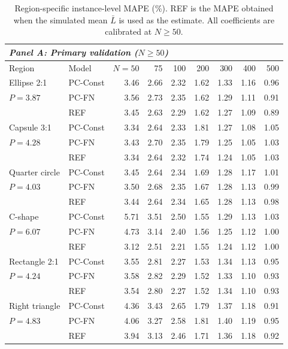 \begin{table}[htbp]
\centering
\caption{Region-specific instance-level MAPE (\%). REF is the MAPE obtained when the simulated mean $\bar{L}$ is used as the estimate. All coefficients are calibrated at $N \ge 50$.}
\label{tab:A2}
\scriptsize
\begin{tabular}{llrrrrrrr}
\toprule
\multicolumn{9}{l}{\textit{Panel A: Primary validation ($N \ge 50$)}} \\
\midrule
Region & Model & $N = 50$ & 75 & 100 & 200 & 300 & 400 & 500 \\
\midrule
Ellipse 2:1 & PC-Const & 3.46 & 2.66 & 2.32 & 1.62 & 1.33 & 1.16 & 0.96 \\
$P = 3.87$ & PC-FN & 3.56 & 2.73 & 2.35 & 1.62 & 1.29 & 1.11 & 0.91 \\
 & REF & 3.45 & 2.63 & 2.29 & 1.62 & 1.27 & 1.09 & 0.89 \\
\addlinespace[2pt]
Capsule 3:1 & PC-Const & 3.34 & 2.64 & 2.33 & 1.81 & 1.27 & 1.08 & 1.05 \\
$P = 4.28$ & PC-FN & 3.43 & 2.70 & 2.35 & 1.79 & 1.25 & 1.05 & 1.03 \\
 & REF & 3.34 & 2.64 & 2.32 & 1.74 & 1.24 & 1.05 & 1.03 \\
\addlinespace[2pt]
Quarter circle & PC-Const & 3.45 & 2.64 & 2.34 & 1.69 & 1.28 & 1.17 & 1.01 \\
$P = 4.03$ & PC-FN & 3.50 & 2.68 & 2.35 & 1.67 & 1.28 & 1.13 & 0.99 \\
 & REF & 3.44 & 2.64 & 2.34 & 1.65 & 1.28 & 1.13 & 0.98 \\
\addlinespace[2pt]
C-shape & PC-Const & 5.71 & 3.51 & 2.50 & 1.55 & 1.29 & 1.13 & 1.03 \\
$P = 6.07$ & PC-FN & 4.73 & 3.14 & 2.40 & 1.56 & 1.25 & 1.12 & 1.00 \\
 & REF & 3.12 & 2.51 & 2.21 & 1.55 & 1.24 & 1.12 & 1.00 \\
\addlinespace[2pt]
Rectangle 2:1 & PC-Const & 3.55 & 2.81 & 2.27 & 1.53 & 1.34 & 1.13 & 0.95 \\
$P = 4.24$ & PC-FN & 3.58 & 2.82 & 2.29 & 1.52 & 1.33 & 1.10 & 0.93 \\
 & REF & 3.54 & 2.80 & 2.27 & 1.52 & 1.34 & 1.10 & 0.93 \\
\addlinespace[2pt]
Right triangle & PC-Const & 4.36 & 3.43 & 2.65 & 1.79 & 1.37 & 1.18 & 0.91 \\
$P = 4.83$ & PC-FN & 4.06 & 3.27 & 2.58 & 1.81 & 1.40 & 1.19 & 0.95 \\
 & REF & 3.94 & 3.13 & 2.46 & 1.71 & 1.36 & 1.18 & 0.92 \\

\end{tabular}
\end{table}
